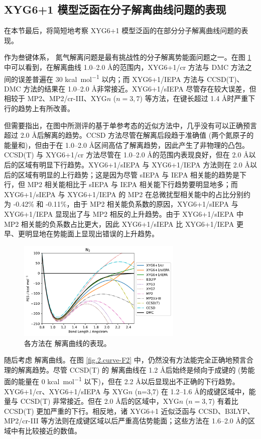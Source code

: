 \subsection{XYG6+1 模型泛函在分子解离曲线问题的表现}

在本节最后，将简短地考察 XYG6+1 模型泛函的在部分分子解离曲线问题的表现。

作为叁键体系， 氮气解离问题是最有挑战性的分子解离势能面问题之一。在图 \ref{fig.2.curve-N2} 中可以看到，在解离曲线 1.0--2.0 \AA 的范围内，XYG6+1/cr 方法与 DMC 方法之间的误差普遍在 30 \si{kcal.mol^{-1}} 以内；而 XYG6+1/IEPA 方法与 CCSD(T)、DMC 方法的结果在 1.0--2.0 \AA 非常接近。XYG6+1/sIEPA 尽管存在较大误差，但相较于 MP2、MP2/cr-III、XYG$n$ ($n=3,7$) 等方法，在键长超过 1.4 \AA 时严重下行的趋势上有所改善。

但需要指出，在图中所测评的基于单参考态的近似方法中，几乎没有可以正确预言超过 2.0 \AA 后解离的趋势。CCSD 方法尽管在解离后段趋于准确值 (两个氮原子的能量和)，但由于在 1.0--2.0 \AA 区间高估了解离趋势，因此产生了非物理的凸包。CCSD(T) 与 XYG6+1/cr 方法尽管在 1.0--2.0 \AA 的范围内表现良好，但在 2.0 \AA 以后的区域有明显下行趋势。XYG6+1/sIEPA 与 XYG6+1/IEPA 方法则在 2.0 \AA 以后的区域有明显的上行趋势；这是因为尽管 sIEPA 与 IEPA 相关能的趋势是下行，但 MP2 相关能相比于 sIEPA 与 IEPA 相关能下行趋势要明显地多；而 XYG6+1/sIEPA 与 XYG6+1/IEPA 的 MP2 在总微扰型相关能中的占比分别约为 -0.42\% 和 -0.11\%，由于 MP2 相关能负系数的原因，XYG6+1/sIEPA 与 XYG6+1/IEPA 显现出了与 MP2 相反的上升趋势。由于 XYG6+1/sIEPA 中 MP2 相关能的负系数占比更大，因此 XYG6+1/sIEPA 比 XYG6+1/IEPA 更早、更明显地在势能面上显现出错误的上升趋势。

\begin{figure}[h]
  \centering
  \includegraphics[width=0.7\textwidth]{assets/curve-N2.pdf}
  \caption[ 解离曲线表现]{各方法在  解离曲线的表现。}
  \label{fig.2.curve-N2}
\end{figure}

随后考虑  解离曲线。在图 \ref{fig.2.curve-F2} 中，仍然没有方法能完全正确地预言合理的解离趋势。尽管 CCSD(T) 的  解离曲线在 1.2 \AA 后始终是倾向于成键的 (势能面的能量在 0 \si{kcal.mol^{-1}} 以下)，但在 2.2 \AA 以后显现出不正确的下行趋势。XYG6+1/cr、XYG6+1/sIEPA 与 XYG$n$ (n=3,7) 在 1.2--1.6 \AA 的成键区域中，能量与 CCSD(T) 非常接近。但在 2.0 \AA 后的区域中，XYG$n$ ($n=3,7$) 有着比 CCSD(T) 更加严重的下行。相反地，诸 XYG6+1 近似泛函与 CCSD、B3LYP、MP2/cr-III 等方法则在成键区域以后严重高估势能面；这些方法在 1.6--2.0 \AA 的区域中有比较接近的数值。

